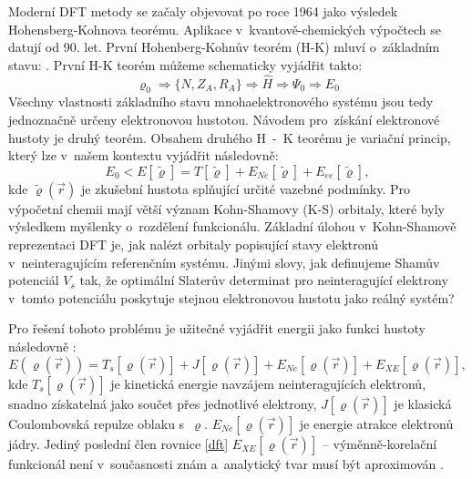 \documentclass[
digital, %
table,   %
nolof,     %
nolot,     %
oneside,
]{fithesis3}
\begin{document}
Moderní DFT metody se začaly objevovat po roce 1964 jako výsledek Hohensberg-Kohnova teorému. Aplikace v~kvantově-chemických výpočtech se datují od 90. let. První Hohenberg-Kohnův teorém (H-K) mluví o~základním stavu: \cite{PhysRev.136.B864}. První H-K teorém můžeme schematicky vyjádřit takto:
\begin{equation}
\varrho_0 \Rightarrow \{N, Z_A, R_A\} \Rightarrow \widehat{H} \Rightarrow \Psi_0 \Rightarrow E_0
\end{equation}
Všechny vlastnosti základního stavu mnohaelektronového systému jsou tedy jednoznačně určeny elektronovou hustotou. Návodem pro~získání elektronové hustoty je druhý teorém. Obsahem druhého H~-~K teorému je variační princip, který lze v~našem kontextu vyjádřit následovně:
\begin{equation}
E_0 < E [\tilde{\varrho}] = T[\tilde{\varrho}] + E_{Ne}[\tilde{\varrho}] + E_{ee}[\tilde{\varrho}],
\end{equation}
kde $\tilde{\varrho}(\vec{r})$ je zkušební hustota splňující určité vazebné podmínky. Pro výpočetní chemii mají větší význam Kohn-Shamovy (K-S) orbitaly, které byly výsledkem myšlenky o~rozdělení funkcionálu. Základní úlohou v~Kohn-Shamově reprezentaci DFT je, jak nalézt orbitaly popisující stavy elektronů v~neinteragujícím referenčním systému. Jinými slovy, jak definujeme Shamův potenciál $V_s$ tak, že optimální Slaterův determinat pro neinteragující elektrony v~tomto potenciálu poskytuje stejnou elektronovou hustotu jako reálný systém?

Pro řešení tohoto problému je užitečné vyjádřit energii jako funkci hustoty následovně \cite{jensen2007introduction, koch2000chemist}:
\begin{equation}
E(\varrho(\vec{r})) = T_s[\varrho(\vec{r})] + J[\varrho(\vec{r})] + E_{Ne}[\varrho(\vec{r})] + E_{XE}[\varrho(\vec{r})],
\label{dft}
\end{equation}
kde $T_s[\varrho(\vec{r})]$ je kinetická energie navzájem neinteragujících elektronů, snadno získatelná jako součet přes jednotlivé elektrony, $J[\varrho(\vec{r})]$ je klasická Coulombovská repulze oblaku s~$\varrho$.
$E_{Ne}[\varrho(\vec{r})]$ je energie atrakce elektronů jádry. Jediný poslední člen rovnice \ref{dft} $E_{XE}[\varrho(\vec{r})] $ -- výměnně-korelační funkcionál není v~současnosti znám a~analytický tvar musí být aproximován \cite{parr1994density}.
\end{document}

